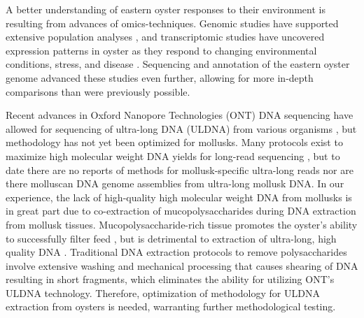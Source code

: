\documentclass[lineno,referee,pdflatex,sn-basic]{sn-jnl}%
\begin{document}
A better understanding of eastern oyster responses to their environment is resulting from advances of omics-techniques. Genomic studies have supported extensive population analyses \cite{hornick_genomewide_2022, strickland_population_2024, varney_population_2009}, and transcriptomic studies have uncovered expression patterns in oyster as they respond to changing environmental conditions, stress, and disease \cite{chapman_transcriptomic_2011, eierman_transcriptomic_2014, eierman_reef-specific_2016, wang_microarray_2010}. Sequencing and annotation of the eastern oyster genome \cite{gomez-chiarri_developing_2015} advanced these studies even further, allowing for more in-depth comparisons than were previously possible.

Recent advances in Oxford Nanopore Technologies (ONT) DNA sequencing have allowed for sequencing of ultra-long DNA (ULDNA) from various organisms \cite{frei_ultralong_2021, jain_nanopore_2018, lu_nanopore_2024}, but methodology has not yet been optimized for mollusks. Many protocols exist to maximize high molecular weight DNA yields for long-read sequencing \cite{cahyani_findingnemo_2024, denton_sanger_2024, gong_ultra-long_2019, jackson_sanger_2023, nishii_high_2023, strickland_sanger_2023, todorovic_sanger_2023}, but to date there are no reports of methods for mollusk-specific ultra-long reads nor are there molluscan DNA genome assemblies from ultra-long mollusk DNA. In our experience, the lack of high-quality high molecular weight DNA from mollusks is in great part due to co-extraction of mucopolysaccharides during DNA extraction from mollusk tissues. Mucopolysaccharide-rich tissue promotes the oyster’s ability to successfully filter feed \cite{beninger_role_1997}, but is detrimental to extraction of ultra-long, high quality DNA \cite{adema_sticky_2021}. Traditional DNA extraction protocols to remove polysaccharides involve extensive washing and mechanical processing that causes shearing of DNA resulting in short fragments, which eliminates the ability for utilizing ONT’s ULDNA technology. Therefore, optimization of methodology for ULDNA extraction from oysters is needed, warranting further methodological testing.
\end{document}
